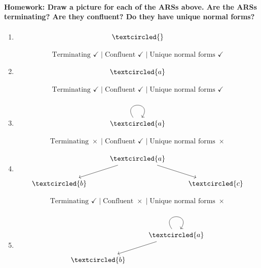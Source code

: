 \documentclass{article}
\theoremstyle{theorem}
\theoremstyle{definition}
\theoremstyle{remark}
\begin{document}
\paragraph{Homework: Draw a picture for each of the ARSs above. Are the ARSs terminating? Are they confluent? Do they have unique normal forms?}

\begin{enumerate}
    \item %
\[\begin{tikzcd}
	\textcircled{ }
\end{tikzcd}\]

\[
\text{Terminating } \checkmark
\;\big|\;
\text{Confluent } \checkmark
\;\big|\;
\text{Unique normal forms } \checkmark
\]

    \item %
\[\begin{tikzcd}
	{\textcircled{a}}
\end{tikzcd}\]

\[
\text{Terminating } \checkmark
\;\big|\;
\text{Confluent } \checkmark
\;\big|\;
\text{Unique normal forms } \checkmark
\]

    \item %
\[\begin{tikzcd}
	{\textcircled{a}}
	\arrow[from=1-1, to=1-1, loop, in=55, out=125, distance=10mm]
\end{tikzcd}\]

\[
\text{Terminating } \times
\;\big|\;
\text{Confluent } \checkmark
\;\big|\;
\text{Unique normal forms } \times
\]

    \item %
\[\begin{tikzcd}
	& {\textcircled{a}} \\
	{\textcircled{b}} && {\textcircled{c}}
	\arrow[from=1-2, to=2-1]
	\arrow[from=1-2, to=2-3]
\end{tikzcd}\]

\[
\text{Terminating } \checkmark
\;\big|\;
\text{Confluent } \times
\;\big|\;
\text{Unique normal forms } \times
\]


    \item %
\[\begin{tikzcd}
	& {\textcircled{a}} \\
	{\textcircled{b}}
	\arrow[from=1-2, to=1-2, loop, in=55, out=125, distance=10mm]
	\arrow[from=1-2, to=2-1]
\end{tikzcd}\]


\end{enumerate}
\end{document}
